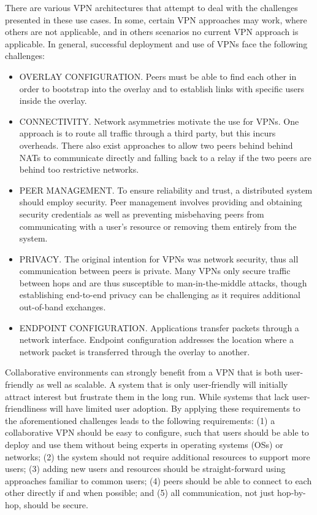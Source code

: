 There are various VPN architectures that attempt to deal with the challenges
presented in these use cases.  In some, certain VPN approaches may work, where
others are not applicable, and in others scenarios no current VPN approach is
applicable.  In general, successful deployment and use of VPNs face the
following challenges:  

\begin{itemize}

\item OVERLAY CONFIGURATION. Peers must be able to find each other in order to
bootstrap into the overlay and to establish links with specific users inside
the overlay.

\item CONNECTIVITY. Network asymmetries motivate the use for VPNs.  One
approach is to route all traffic through a third party, but this incurs
overheads.  There also exist approaches to allow two peers behind behind NATs
to communicate directly and falling back to a relay if the two peers are behind
too restrictive networks.

\item PEER MANAGEMENT. To ensure reliability and trust, a distributed system
should employ security.  Peer management involves providing and obtaining
security credentials as well as preventing misbehaving peers from communicating
with a user's resource or removing them entirely from the system.

\item PRIVACY. The original intention for VPNs was network security,
thus all communication between peers is private.  Many VPNs only secure traffic
between hops and are thus susceptible to man-in-the-middle attacks, though
establishing end-to-end privacy can be challenging as it requires additional
out-of-band exchanges.

\item ENDPOINT CONFIGURATION. Applications transfer packets through
a network interface.  Endpoint configuration addresses the location where a
network packet is transferred through the overlay to another.

\end{itemize}

Collaborative environments can strongly benefit from a VPN that is both
user-friendly as well as scalable.  A system that is only user-friendly will
initially attract interest but frustrate them in the long run.  While systems
that lack user-friendliness will have limited user adoption.  By applying these
requirements to the aforementioned challenges leads to the following
requirements:  (1) a collaborative VPN should be easy to configure, such that
users should be able to deploy and use them without being experts in operating
systems (OSs) or networks; (2) the system should not require additional
resources to support more users; (3) adding new users and resources should be
straight-forward using approaches familiar to common users; (4) peers should be
able to connect to each other directly if and when possible; and (5) all
communication, not just hop-by-hop, should be secure.

